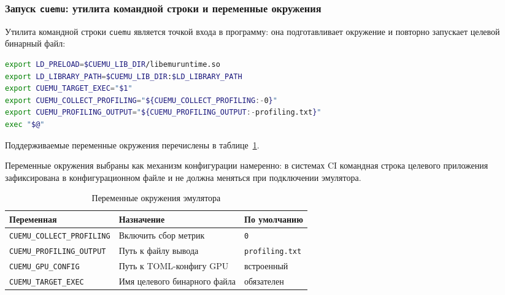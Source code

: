 \subsubsection{Запуск \texttt{cuemu}: утилита командной строки и переменные окружения}

Утилита командной строки \texttt{cuemu} является точкой входа в программу: она подготавливает
окружение и повторно запускает целевой бинарный файл:

\begin{lstlisting}[language=sh, caption={Логика запуска cuemu}]
export LD_PRELOAD=$CUEMU_LIB_DIR/libemuruntime.so
export LD_LIBRARY_PATH=$CUEMU_LIB_DIR:$LD_LIBRARY_PATH
export CUEMU_TARGET_EXEC="$1"
export CUEMU_COLLECT_PROFILING="${CUEMU_COLLECT_PROFILING:-0}"
export CUEMU_PROFILING_OUTPUT="${CUEMU_PROFILING_OUTPUT:-profiling.txt}"
exec "$@"
\end{lstlisting}

Поддерживаемые переменные окружения перечислены в таблице~\ref{tab:env_vars}.

Переменные окружения выбраны как механизм конфигурации намеренно:
в системах CI командная строка целевого приложения зафиксирована
в конфигурационном файле и не должна меняться при подключении эмулятора.

\begin{table}[h]
  \caption{Переменные окружения эмулятора}
  \label{tab:env_vars}
  \centering
  \begin{tabularx}{\linewidth}{lXl}
    \toprule
    \textbf{Переменная} & \textbf{Назначение} & \textbf{По умолчанию} \\
    \midrule
    \texttt{CUEMU\_COLLECT\_PROFILING} & Включить сбор метрик & \texttt{0} \\
    \texttt{CUEMU\_PROFILING\_OUTPUT}  & Путь к файлу вывода   & \texttt{profiling.txt} \\
    \texttt{CUEMU\_GPU\_CONFIG}        & Путь к TOML-конфигу GPU & встроенный \\
    \texttt{CUEMU\_TARGET\_EXEC}       & Имя целевого бинарного файла & обязателен \\
    \bottomrule
  \end{tabularx}
\end{table}

\newpage
